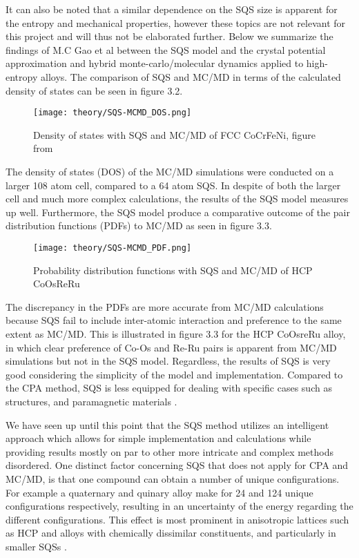 It can also be noted that a similar dependence on the SQS size is apparent for the entropy and mechanical properties, however these topics are not relevant for this project and will thus not be elaborated further. Below we summarize the findings of M.C Gao et al between the SQS model and the crystal potential approximation and hybrid monte-carlo/molecular dynamics applied to high-entropy alloys. The comparison of SQS and MC/MD in terms of the calculated density of states can be seen in figure 3.2.
      
\begin{figure}[H]
\centering
\texttt{[image: theory/SQS-MCMD\_DOS.png]}
\caption{Density of states with SQS and MC/MD of FCC CoCrFeNi, figure from \cite{hea2016_ch10}}
\end{figure}

The density of states (DOS) of the MC/MD simulations were conducted on a larger 108 atom cell, compared to a 64 atom SQS. In despite of both the larger cell and much more complex calculations, the results of the SQS model measures up well. Furthermore, the SQS model produce a comparative outcome of the pair distribution functions (PDFs) to MC/MD as seen in figure 3.3. 

\begin{figure}[H]
\centering
\texttt{[image: theory/SQS-MCMD\_PDF.png]}
\caption{Probability distribution functions with SQS and MC/MD of HCP CoOsReRu \cite{hea2016_ch10}}
\end{figure}

The discrepancy in the PDFs are more accurate from MC/MD calculations because SQS fail to include inter-atomic interaction and preference to the same extent as MC/MD. This is illustrated in figure 3.3 for the HCP CoOsreRu alloy, in which clear preference of Co-Os and Re-Ru pairs is apparent from MC/MD simulations but not in the SQS model. Regardless, the results of SQS is very good considering the simplicity of the model and implementation. Compared to the CPA method, SQS is less equipped for dealing with specific cases such as  structures, and paramagnetic materials \cite{hea2016_ch10}. 

We have seen up until this point that the SQS method utilizes an intelligent approach which allows for simple implementation and calculations while providing results mostly on par to other more intricate and complex methods disordered. One distinct factor concerning SQS that does not apply for CPA and MC/MD, is that one compound can obtain a number of unique configurations. For example a quaternary and quinary alloy make for 24 and 124 unique configurations respectively, resulting in an uncertainty of the energy regarding the different configurations. This effect is most prominent in anisotropic lattices such as HCP and alloys with chemically dissimilar constituents, and particularly in smaller SQSs \cite{hea2016_ch10}. 
 
